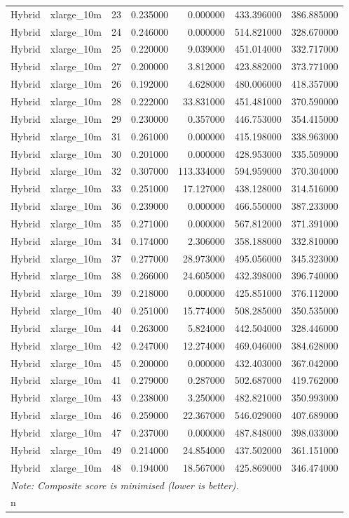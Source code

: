 \begin{tabular}{llrrrrr}
Hybrid & xlarge_10m & 23 & 0.235000 & 0.000000 & 433.396000 & 386.885000 \\
Hybrid & xlarge_10m & 24 & 0.246000 & 0.000000 & 514.821000 & 328.670000 \\
Hybrid & xlarge_10m & 25 & 0.220000 & 9.039000 & 451.014000 & 332.717000 \\
Hybrid & xlarge_10m & 27 & 0.200000 & 3.812000 & 423.882000 & 373.771000 \\
Hybrid & xlarge_10m & 26 & 0.192000 & 4.628000 & 480.006000 & 418.357000 \\
Hybrid & xlarge_10m & 28 & 0.222000 & 33.831000 & 451.481000 & 370.590000 \\
Hybrid & xlarge_10m & 29 & 0.230000 & 0.357000 & 446.753000 & 354.415000 \\
Hybrid & xlarge_10m & 31 & 0.261000 & 0.000000 & 415.198000 & 338.963000 \\
Hybrid & xlarge_10m & 30 & 0.201000 & 0.000000 & 428.953000 & 335.509000 \\
Hybrid & xlarge_10m & 32 & 0.307000 & 113.334000 & 594.959000 & 370.304000 \\
Hybrid & xlarge_10m & 33 & 0.251000 & 17.127000 & 438.128000 & 314.516000 \\
Hybrid & xlarge_10m & 36 & 0.239000 & 0.000000 & 466.550000 & 387.233000 \\
Hybrid & xlarge_10m & 35 & 0.271000 & 0.000000 & 567.812000 & 371.391000 \\
Hybrid & xlarge_10m & 34 & 0.174000 & 2.306000 & 358.188000 & 332.810000 \\
Hybrid & xlarge_10m & 37 & 0.277000 & 28.973000 & 495.056000 & 345.323000 \\
Hybrid & xlarge_10m & 38 & 0.266000 & 24.605000 & 432.398000 & 396.740000 \\
Hybrid & xlarge_10m & 39 & 0.218000 & 0.000000 & 425.851000 & 376.112000 \\
Hybrid & xlarge_10m & 40 & 0.251000 & 15.774000 & 508.285000 & 350.535000 \\
Hybrid & xlarge_10m & 44 & 0.263000 & 5.824000 & 442.504000 & 328.446000 \\
Hybrid & xlarge_10m & 42 & 0.247000 & 12.274000 & 469.046000 & 384.628000 \\
Hybrid & xlarge_10m & 45 & 0.200000 & 0.000000 & 432.403000 & 367.042000 \\
Hybrid & xlarge_10m & 41 & 0.279000 & 0.287000 & 502.687000 & 419.762000 \\
Hybrid & xlarge_10m & 43 & 0.238000 & 3.250000 & 482.821000 & 350.993000 \\
Hybrid & xlarge_10m & 46 & 0.259000 & 22.367000 & 546.029000 & 407.689000 \\
Hybrid & xlarge_10m & 47 & 0.237000 & 0.000000 & 487.848000 & 398.033000 \\
Hybrid & xlarge_10m & 49 & 0.214000 & 24.854000 & 437.502000 & 361.151000 \\
Hybrid & xlarge_10m & 48 & 0.194000 & 18.567000 & 425.869000 & 346.474000 \\
\bottomrule
\multicolumn{6}{l}{\small\textit{Note: Composite score is minimised (lower is better).}}\\n
\end{tabular}
